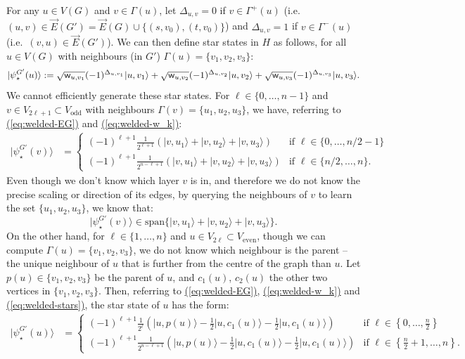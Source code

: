 \documentclass{article}
\newcommand{\eq}[1]{\hyperref[eq:#1]{(\ref*{eq:#1})}}
\def\ket#1{{\lvert}#1\rangle}
\renewcommand{\>}{\rangle}
\newcommand{\<}{\langle}
\renewcommand{\(}{\left(}
\renewcommand{\)}{\right)}
\def\w{{\sf w}}
\begin{document}
For any $u\in V(G)$ and $v\in \Gamma(u)$, let $\Delta_{u,v}=0$ if $v\in\Gamma^+(u)$ (i.e.~$(u,v)\in\overrightarrow{E}(G')=\overrightarrow{E}(G)\cup\{(s,v_0),(t,v_0)\}$) and $\Delta_{u,v}=1$ if $v\in\Gamma^-(u)$ (i.e.~$(v,u)\in\overrightarrow{E}(G')$). 
We can then define star states in $H$ as follows, for all $u\in V(G)$ with neighbours (in $G'$) $\Gamma(u)=\{v_1,v_2,v_3\}$:  
\begin{equation}
\ket{\psi_\star^{G'}(u)} := \sqrt{\w_{u,v_1}}(-1)^{\Delta_{u,v_1}}\ket{u,v_1}+\sqrt{\w_{u,v_2}}(-1)^{\Delta_{u,v_2}}\ket{u,v_2}+\sqrt{\w_{u,v_3}}(-1)^{\Delta_{u,v_3}}\ket{u,v_3}.\label{eq:welded-stars}
\end{equation}
We cannot efficiently generate these star states. For $\ell\in \{0,\dots,n-1\}$ and $v\in V_{2\ell+1}\subset V_{\mathrm{odd}}$ with neighbours $\Gamma(v)=\{u_1,u_2,u_3\}$, we have, referring to \eq{welded-EG} and \eq{welded-w_k}:
\begin{equation}
\begin{split}
\ket{\psi_\star^{G'}(v)} &= \left\{\begin{array}{ll}
(-1)^{\ell+1}\frac{1}{2^{\ell+1}}\left(\ket{v,u_1}+\ket{v,u_2}+\ket{v,u_3} \right) & \mbox{if }\ell\in\{0,\dots,n/2-1\}\\
(-1)^{\ell+1}\frac{1}{2^{n-\ell+1}}\left(\ket{v,u_1}+\ket{v,u_2}+\ket{v,u_3} \right) & \mbox{if }\ell\in \{n/2,\dots,n\}.
\end{array}\right.
\end{split}\label{eq:welded-stars-B}
\end{equation}
Even though we don't know which layer $v$ is in, and therefore we do not know the precise scaling or direction of its edges, by querying the neighbours of $v$ to learn the set $\{u_1,u_2,u_3\}$, we know that:
$$\ket{\psi_\star^{G'}(v)}\in\mathrm{span}\{\ket{v,u_1}+\ket{v,u_2}+\ket{v,u_3}\}.$$
On the other hand, for $\ell\in\{1,\dots,n\}$ and $u\in V_{2\ell}\subset V_{\mathrm{even}}$, though we can compute $\Gamma(u)=\{v_1,v_2,v_3\}$, we do not know which neighbour is the parent -- the unique neighbour of $u$ that is further from the centre of the graph than $u$. Let $p(u)\in\{v_1,v_2,v_3\}$ be the parent of $u$, and $c_1(u)$, $c_2(u)$ the other two vertices in $\{v_1,v_2,v_3\}$. Then, referring to \eq{welded-EG}, \eq{welded-w_k} and \eq{welded-stars}, the star state of $u$ has the form:
\begin{align*}
\ket{\psi_\star^{G'}(u)}
&=\left\{\begin{array}{ll}
(-1)^{\ell+1}\frac{1}{2^{\ell}}\left(\ket{u,p(u)}-\frac{1}{2}\ket{u,c_1(u)}-\frac{1}{2}\ket{u,c_1(u)}\right) & \mbox{if }\ell\in\left\{0,\dots,\frac{n}{2}\right\}\\
 (-1)^{\ell+1}\frac{1}{2^{n-\ell+1}}\left(\ket{u,p(u)}-\frac{1}{2}\ket{u,c_1(u)}-\frac{1}{2}\ket{u,c_1(u)}\right)& \mbox{if }\ell\in\left\{\frac{n}{2}+1,\dots,n\right\}.
\end{array}\right.
\end{align*}
\end{document}
